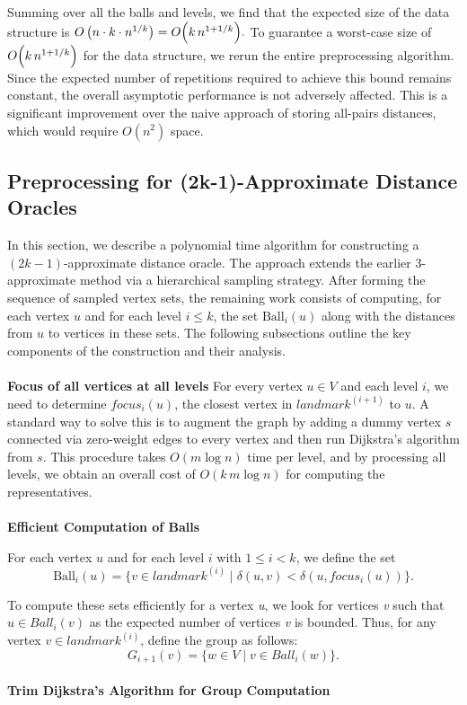 \documentclass{article}
\begin{document}
Summing over all the balls and levels, we find that the expected size of the data structure is
\(
O\left(n \cdot k \cdot n^{1/k}\right) = O\Bigl(k\,n^{1+1/k}\Bigr).
\)
To guarantee a worst-case size of \(O\Bigl(k\,n^{1+1/k}\Bigr)\) for the data structure, we rerun the entire preprocessing algorithm. Since the expected number of repetitions required to achieve this bound remains constant, the overall asymptotic performance is not adversely affected. This is a significant improvement over the naive approach of storing all-pairs distances, which would require \(O(n^2)\) space.

\subsection{Preprocessing for (2k-1)-Approximate Distance Oracles}

In this section, we describe a polynomial time algorithm for constructing a \((2k-1)\)-approximate distance oracle. The approach extends the earlier 3-approximate method via a hierarchical sampling strategy. After forming the sequence of sampled vertex sets, the remaining work consists of computing, for each vertex \(u\) and for each level \(i \le k\), the set \(\text{Ball}_i(u)\) along with the distances from \(u\) to vertices in these sets. The following subsections outline the key components of the construction and their analysis.
\\\\
\textbf{Focus of all vertices at all levels}
For every vertex \(u \in V\) and each level \(i\), we need to determine \(focus_i(u)\), the closest vertex in \(landmark^{(i+1)}\) to \(u\). A standard way to solve this is to augment the graph by adding a dummy vertex \(s\) connected via zero-weight edges to every vertex and then run Dijkstra's algorithm from \(s\). This procedure takes \(O(m \log n)\) time per level, and by processing all levels, we obtain an overall cost of \(O(k\,m \log n)\) for computing the representatives.
\\\\
\textbf{Efficient Computation of Balls}
\newline

For each vertex \(u\) and for each level \(i\) with \(1 \le i < k\), we define the set
\[
\text{Ball}_i(u) = \{v \in landmark^{(i)} \mid \delta(u,v) < \delta(u, focus_{i}(u))\}.
\]

To compute these sets efficiently for a vertex \textit{u}, we look for vertices \textit{v} such that \(u \in Ball_i(v)\) as the expected number of vertices \textit{v} is bounded. Thus, for any vertex \(v \in landmark^{(i)}\), define the group as follows:
\[
G_{i+1}(v) = \{w \in V \mid v \in Ball_i(w)\}.
\]
\\
\textbf{Trim Dijkstra's Algorithm for Group Computation}\\
\end{document}
